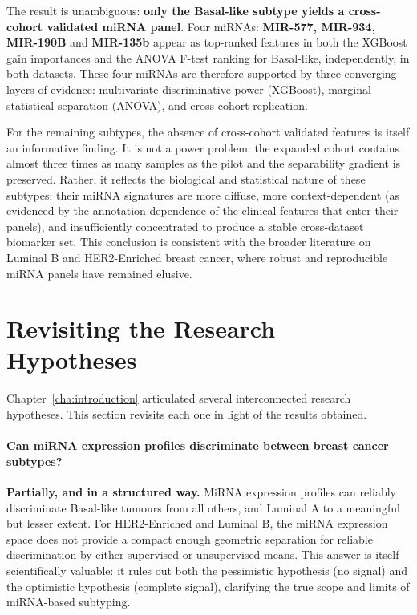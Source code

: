 The result is unambiguous: \textbf{only the Basal-like subtype yields a cross-cohort
validated miRNA panel}. Four miRNAs: \textbf{MIR-577, MIR-934, MIR-190B} and
\textbf{MIR-135b} appear as top-ranked features in both the XGBoost gain
importances and the ANOVA F-test ranking for Basal-like, independently, in both
datasets. These four miRNAs are therefore supported by three converging layers of
evidence: multivariate discriminative power (XGBoost), marginal statistical
separation (ANOVA), and cross-cohort replication.
 
For the remaining subtypes, the absence of cross-cohort validated features is itself
an informative finding. It is not a power problem: the expanded cohort contains almost
three times as many samples as the pilot and the separability gradient is preserved.
Rather, it reflects the biological and statistical nature of these subtypes: their
miRNA signatures are more diffuse, more context-dependent (as evidenced by the
annotation-dependence of the clinical features that enter their panels), and
insufficiently concentrated to produce a stable cross-dataset biomarker set. This
conclusion is consistent with the broader literature on Luminal B and HER2-Enriched
breast cancer, where robust and reproducible miRNA panels have remained elusive.
 
\section{Revisiting the Research Hypotheses}
\label{sec:disc_hypothesis}
 
Chapter~\ref{cha:introduction} articulated several interconnected research hypotheses.
This section revisits each one in light of the results obtained.
 
\paragraph{Can miRNA expression profiles discriminate between breast cancer subtypes?}
\textbf{Partially, and in a structured way.}
MiRNA expression profiles can reliably discriminate Basal-like tumours from all others,
and Luminal A to a meaningful but lesser extent. For HER2-Enriched and Luminal B, the
miRNA expression space does not provide a compact enough geometric separation for
reliable discrimination by either supervised or unsupervised means. This answer is
itself scientifically valuable: it rules out both the pessimistic hypothesis (no
signal) and the optimistic hypothesis (complete signal), clarifying the true scope and
limits of miRNA-based subtyping.
 
